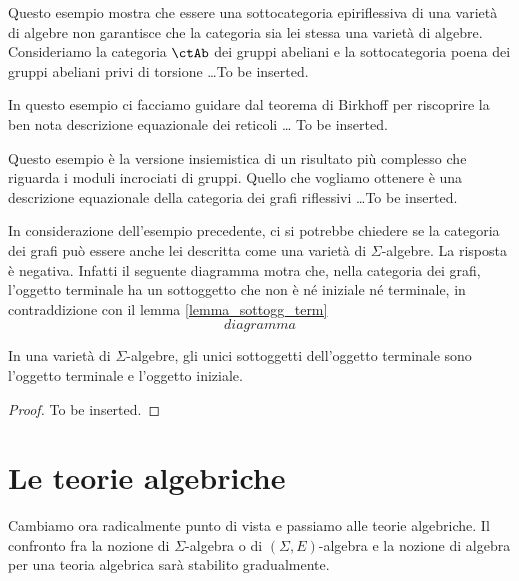 \begin{example}\label{esempio_torsionfree}
	Questo esempio mostra che essere una sottocategoria epiriflessiva di una varietà di algebre non garantisce che la categoria
	sia lei stessa una varietà di algebre. Consideriamo la categoria \(\ctAb\) dei gruppi abeliani e la sottocategoria poena dei gruppi
	abeliani privi di torsione \ldots To be inserted.
\end{example}

\begin{example}\label{esempio_Birkhoff_reticoli}
	In questo esempio ci facciamo guidare dal teorema di Birkhoff per riscoprire la ben nota descrizione equazionale dei reticoli \ldots
	To be inserted.
\end{example}

\begin{example}\label{esempio_grafi_riflessivi}
	Questo esempio è la versione insiemistica di un risultato più complesso che riguarda i moduli incrociati di gruppi. Quello che
	vogliamo ottenere è una descrizione equazionale della categoria dei grafi riflessivi \ldots To be inserted.
\end{example}

\begin{example}\label{esempio_grafi_noneq}
	In considerazione dell'esempio precedente, ci si potrebbe chiedere se la categoria dei grafi può essere anche lei descritta come una
	varietà di \(\Sigma\)-algebre. La risposta è negativa. Infatti il seguente diagramma motra che, nella categoria dei grafi, l'oggetto terminale
	ha un sottoggetto che non è né iniziale né terminale, in contraddizione con il lemma \ref{lemma_sottogg_term}
	\[
		diagramma
	\]
\end{example}

\begin{lemma}\label{lemma_sottogg_term}
	In una varietà di \(\Sigma\)-algebre, gli unici sottoggetti dell'oggetto terminale sono l'oggetto terminale e l'oggetto iniziale.
\end{lemma}

\begin{proof}
	To be inserted.
\end{proof}

\section{Le teorie algebriche}\label{sec_teorie_alg}

Cambiamo ora radicalmente punto di vista e passiamo alle teorie algebriche. Il confronto fra la nozione di \(\Sigma\)-algebra
o di \((\Sigma,E)\)-algebra e la nozione di algebra per una teoria algebrica sarà stabilito gradualmente.

